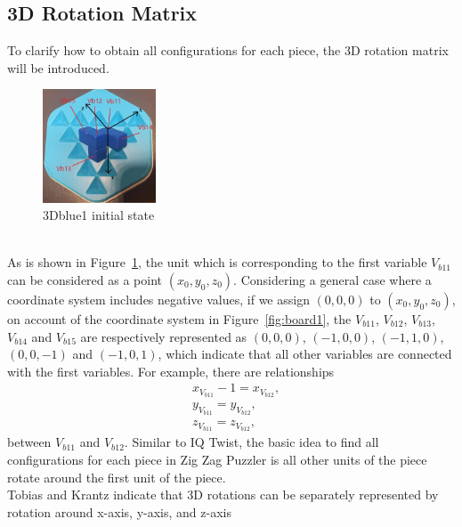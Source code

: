 \subsection{3D Rotation Matrix}
\label{section:3Drotationmatrix}
To clarify how to obtain all configurations for each piece, the 3D rotation matrix will be introduced.
\begin{figure}[htbp]
\label{figure:3Dblue1}
\centering
\includegraphics[width=0.3\textwidth]{figs/3Drotateexplain.jpg}
\caption{3Dblue1 initial state}
\label{fig:3Dblue1explanation}
\end{figure}
\\As is shown in Figure~\ref{fig:3Dblue1explanation}, the unit which is corresponding to the first variable $V_{b11}$ can be considered as a point $(x_{0},y_{0},z_{0})$. Considering a general case where a coordinate system includes negative values, if we assign $(0,0,0)$ to $(x_{0},y_{0},z_{0})$, on account of the coordinate system in Figure~\ref{fig:board1}, the $V_{b11}$, $V_{b12}$, $V_{b13}$, $V_{b14}$ and $V_{b15}$ are respectively represented as $(0,0,0)$, $(-1,0,0)$, $(-1,1,0)$, $(0,0,-1)$ and $(-1,0,1)$, which indicate that all other variables are connected with the first variables. For example, there are relationships
\begin{equation}
\begin{aligned}
&x_{V_{b11}}-1=x_{V_{b12}},\\
&y_{V_{b11}}=y_{V_{b12}},\\
&z_{V_{b11}}=z_{V_{b12}},
\end{aligned}
\end{equation}
between $V_{b11}$ and $V_{b12}$.
Similar to IQ Twist, the basic idea to find all configurations for each piece in Zig Zag Puzzler is all other units of the piece rotate around the first unit of the piece.
\\Tobias and Krantz \cite{r9} indicate that 3D rotations can be separately represented by rotation around x-axis, y-axis, and z-axis 
